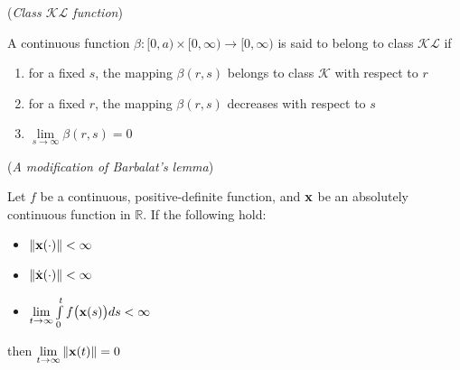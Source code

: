 \begin{definition}\cite{khalil_nonlinear_systems} (\textit{Class $\mathcal{KL}$ function})
\label{def:kl_class}

  A continuous function $\beta : [0, a) \times [0, \infty) \to [0, \infty)$
  is said to belong to class $\mathcal{KL}$ if
  \begin{enumerate}
    \item for a fixed $s$, the mapping $\beta(r,s)$ belongs to class $\mathcal{K}$ with respect to $r$
    \item for a fixed $r$, the mapping $\beta(r,s)$ decreases with respect to $s$
    \item $\lim\limits_{s \to \infty} \beta(r,s) = 0$
\\[2.5ex]
  \end{enumerate}
\end{definition}



  \begin{lemma} \cite{Fontes2007} (\textit{A modification of Barbalat's lemma})
  \label{lemma:barbalat}

    Let $f$ be a continuous, positive-definite function, and $\bm{\mathbf{x}}$ be an
    absolutely continuous function in $\mathbb{R}$. If the following hold:
  \begin{itemize}
    \item $\|\bm{\mathbf{x}}(\cdot)\| < \infty$
    \item $\|\dot{\bm{\mathbf{x}}}(\cdot)\| < \infty$
    \item $\lim\limits_{t \to \infty} \int\limits_0^t f\big(\bm{\mathbf{x}}(s)\big)ds < \infty$
  \end{itemize}
  then $\lim\limits_{t \to \infty} \|\bm{\mathbf{x}}(t)\| = 0$
\\[2.5ex]
  \end{lemma}


